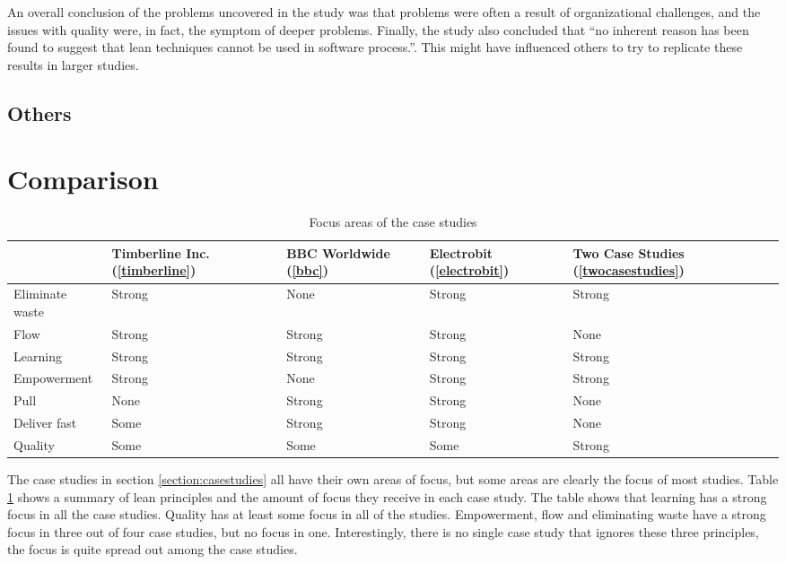 An overall conclusion of the problems uncovered in the study was that problems were often a result of organizational challenges, and the issues with quality were, in fact, the symptom of deeper problems. Finally, the study also concluded that ``no inherent reason has been found to suggest that lean techniques cannot be used in software process.''\cite{Middleton2001Lean}. This might have influenced others to try to replicate these results in larger studies.



\subsection{Others}
\label{othercases}


\section{Comparison}
\label{section:comparison}

\begin{table}
  \begin{tabular}{ | l | p{65pt} | p{65pt} | p{65pt} | p{65pt} |}
    \hline
      & Timberline Inc. (\ref{timberline}) & BBC Worldwide (\ref{bbc}) & Electrobit (\ref{electrobit}) & Two Case Studies (\ref{twocasestudies}) \\
    \hline
    Eliminate waste & Strong & None   & Strong & Strong \\
    \hline
    Flow            & Strong & Strong & Strong & None \\
    \hline
    Learning        & Strong & Strong & Strong & Strong \\
    \hline
    Empowerment     & Strong & None   & Strong & Strong \\
    \hline
    Pull            & None   & Strong & Strong & None \\
    \hline
    Deliver fast    & Some   & Strong & Strong & None \\
    \hline
    Quality         & Some   & Some   & Some   & Strong \\
    \hline
  \end{tabular}
  \caption{Focus areas of the case studies}
  \label{tbl:practices}
\end{table}

The case studies in section \ref{section:casestudies} all have their own areas of focus, but some areas are clearly the focus of most studies. Table \ref{tbl:practices} shows a summary of lean principles and the amount of focus they receive in each case study. The table shows that learning has a strong focus in all the case studies. Quality has at least some focus in all of the studies. Empowerment, flow and eliminating waste have a strong focus in three out of four case studies, but no focus in one. Interestingly, there is no single case study that ignores these three principles, the focus is quite spread out among the case studies.

